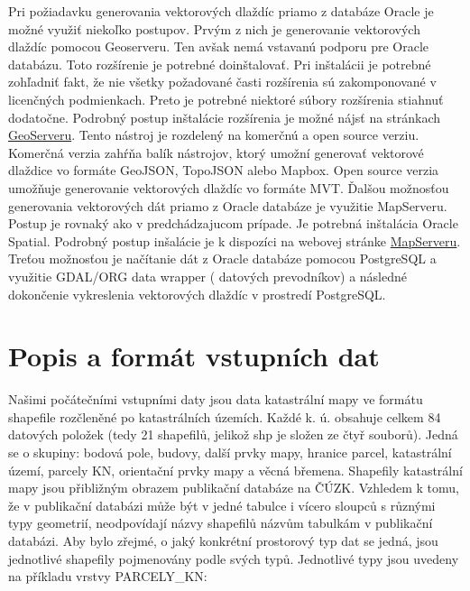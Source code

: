 \documentclass[12pt]{article}
\begin{document}
 Pri požiadavku generovania vektorových dlaždíc priamo z databáze Oracle je možné využiť niekoľko postupov. Prvým z nich je generovanie vektorových dlaždíc pomocou Geoserveru. Ten avšak nemá vstavanú podporu pre Oracle databázu. Toto rozšírenie je potrebné doinštalovať. Pri inštalácii je potrebné zohľadniť fakt, že nie všetky požadované časti rozšírenia sú zakomponované v licenčných podmienkach. Preto je potrebné niektoré súbory rozšírenia stiahnuť dodatočne. Podrobný postup inštalácie rozšírenia je možné nájsť na stránkach \href{https://docs.geoserver.org/latest/en/user/data/database/oracle.html?fbclid=IwAR1LNaub9qU3N7TF0pFdn9-31HN7dunrrw8Nlrc7ZUJF_U0We0TaVyEOulA}{ GeoServeru}. Tento nástroj je rozdelený na komerčnú a open source verziu. Komerčná verzia zahŕňa balík nástrojov, ktorý umožní generovať vektorové dlaždice vo formáte GeoJSON, TopoJSON alebo Mapbox. Open source verzia umožňuje generovanie vektorových dlaždíc vo formáte MVT. \newline  Ďalšou možnosťou generovania vektorových dát priamo z Oracle databáze je využitie MapServeru. Postup je rovnaký ako v predchádzajucom prípade. Je potrebná inštalácia Oracle Spatial. Podrobný postup inšalácie je k dispozíci na webovej stránke \href{https://www.mapserver.org/input/vector/oracle.html?fbclid=IwAR11WezCmV5yU9ekxvdiRg76Bs2FQbJ5fafE6ri6op2os-0ahd5lv_dL3Ho}{ MapServeru}. \newline Treťou možnosťou je načítanie dát z Oracle databáze pomocou PostgreSQL a využitie GDAL/ORG data wrapper ( datových prevodníkov) a následné dokončenie vykreslenia vektorových dlaždíc v prostredí PostgreSQL.

\clearpage
\section{Popis a formát vstupních dat}
Našimi počátečními vstupními daty jsou data katastrální mapy ve formátu shapefile rozčleněné po katastrálních územích. Každé k. ú. obsahuje celkem 84 datových položek (tedy 21 shapefilů, jelikož shp je složen ze čtyř souborů). Jedná se o skupiny: bodová pole, budovy, další prvky mapy, hranice parcel, katastrální území, parcely KN, orientační prvky mapy a věcná břemena. Shapefily katastrální mapy jsou přibližným obrazem publikační databáze na ČÚZK. Vzhledem k tomu, že v publikační databázi může být v jedné tabulce i vícero sloupců s různými typy geometrií, neodpovídají názvy shapefilů názvům tabulkám v publikační databázi. Aby bylo zřejmé, o jaký konkrétní prostorový typ dat se jedná, jsou jednotlivé shapefily pojmenovány podle svých typů. Jednotlivé typy jsou uvedeny na příkladu vrstvy PARCELY\_KN: 
\end{document}
